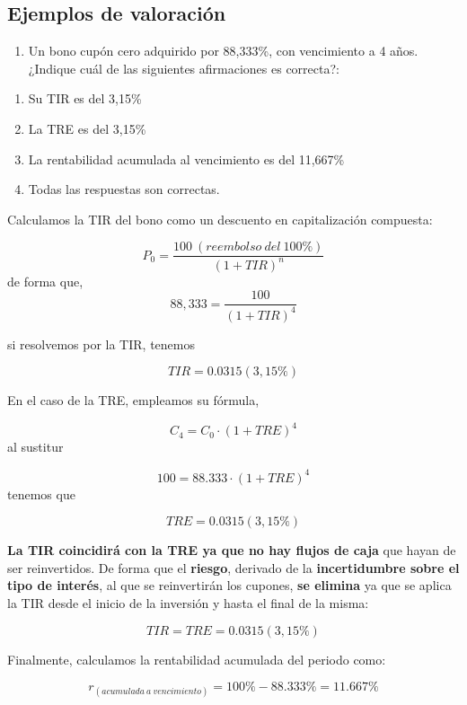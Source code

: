 \documentclass[
  letterpaper,
  DIV=11,
  numbers=noendperiod]{scrartcl}
\providecommand{\tightlist}{%
  \setlength{\itemsep}{0pt}\setlength{\parskip}{0pt}}\usepackage{longtable,booktabs,array}
\begin{document}
\hypertarget{ejemplos-de-valoraciuxf3n}{%
\subsection{Ejemplos de valoración}\label{ejemplos-de-valoraciuxf3n}}

\begin{enumerate}
\def\labelenumi{\arabic{enumi}.}
\tightlist
\item
  Un bono cupón cero adquirido por 88,333\%, con vencimiento a 4 años.
  ¿Indique cuál de las siguientes afirmaciones es correcta?:
\end{enumerate}

\begin{enumerate}
\def\labelenumi{\alph{enumi}.}
\item
  Su TIR es del 3,15\%
\item
  La TRE es del 3,15\%
\item
  La rentabilidad acumulada al vencimiento es del 11,667\%
\item
  Todas las respuestas son correctas.
\end{enumerate}

\begin{tcolorbox}[enhanced jigsaw, colframe=quarto-callout-note-color-frame, opacityback=0, colback=white, leftrule=.75mm, left=2mm, breakable, arc=.35mm, rightrule=.15mm, toprule=.15mm, bottomrule=.15mm]
\begin{minipage}[t]{5.5mm}
\textcolor{quarto-callout-note-color}{\faInfo}
\end{minipage}%
\begin{minipage}[t]{\textwidth - 5.5mm}

Calculamos la TIR del bono como un descuento en capitalización
compuesta:

\[P_0=\frac{100\ (reembolso \ del  \ 100\%)}{\left(1+TIR\right)^n}\] de
forma que, \[88,333=\frac{100}{\left(1+TIR\right)^4}\]

si resolvemos por la TIR, tenemos

\[TIR=0.0315(3,15\%)\]

En el caso de la TRE, empleamos su fórmula,

\[C_4=C _0\cdot (1+TRE)^4\] al sustitur

\[100=88.333\cdot (1+TRE)^4\] tenemos que

\[TRE=0.0315(3,15\%)\]

\textbf{La TIR coincidirá con la TRE ya que no hay flujos de caja} que
hayan de ser reinvertidos. De forma que el \textbf{riesgo}, derivado de
la \textbf{incertidumbre sobre el tipo de interés}, al que se
reinvertirán los cupones, \textbf{se elimina} ya que se aplica la TIR
desde el inicio de la inversión y hasta el final de la misma:

\[TIR=TRE=0.0315(3,15\%)\]

Finalmente, calculamos la rentabilidad acumulada del periodo como:

\[r_{\left(acumulada\:a\:vencimiento\right)}=100\%-88.333\%=11.667\%\]

\end{minipage}%
\end{tcolorbox}
\end{document}
